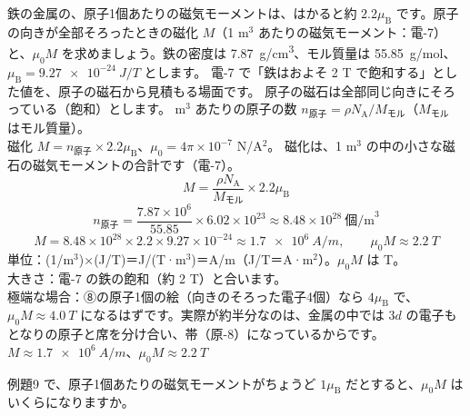 \label{ph:原-7:ex9}
\begin{phreidai}[鉄の原子の磁石を全部そろえると]
鉄の金属の、原子1個あたりの磁気モーメントは、はかると約 $2.2\mu_{\mathrm B}$ です。原子の向きが全部そろったときの磁化 $M$（1 m$^3$ あたりの磁気モーメント：電-7）と、$\mu_0M$ を求めましょう。鉄の密度は \qty{7.87}{g/cm^3}、モル質量は \qty{55.85}{g/mol}、$\mu_{\mathrm B}=\qty{9.27e-24}{J/T}$ とします。
\phbamen
電-7 で「鉄はおよそ 2 T で飽和する」とした値を、原子の磁石から見積もる場面です。
\phmushi
原子の磁石は全部同じ向きにそろっている（飽和）とします。
 m$^3$ あたりの原子の数 $n_{\text{原子}}=\rho N_{\mathrm A}/M_{\text{モル}}$（$M_{\text{モル}}$ はモル質量）。\\
磁化 $M=n_{\text{原子}}\times2.2\mu_{\mathrm B}$、$\mu_0=4\pi\times10^{-7}$ N/A$^2$。
\phriyu
磁化は、1 m$^3$ の中の小さな磁石の磁気モーメントの合計です（電-7）。
\phtateru
\[ M=\frac{\rho N_{\mathrm A}}{M_{\text{モル}}}\times2.2\mu_{\mathrm B} \]
\phtoku
\[ n_{\text{原子}}=\frac{7.87\times10^6}{55.85}\times6.02\times10^{23}\approx8.48\times10^{28}\ \text{個/m}^3 \]
\[ M=8.48\times10^{28}\times2.2\times9.27\times10^{-24}\approx\qty{1.7e6}{A/m},\qquad \mu_0M\approx\qty{2.2}{T} \]
\phtashikame
単位：(1/m$^3$)×(J/T)＝J/(T·m$^3$)＝A/m（J/T＝A·m$^2$）。$\mu_0M$ は T。\\
大きさ：電-7 の鉄の飽和（約 2 T）と合います。\\
極端な場合：⑧の原子1個の絵（向きのそろった電子4個）なら $4\mu_{\mathrm B}$ で、$\mu_0M\approx\qty{4.0}{T}$ になるはずです。実際が約半分なのは、金属の中では $3d$ の電子もとなりの原子と席を分け合い、帯（原-8）になっているからです。
\kotae $M\approx\qty{1.7e6}{A/m}$、$\mu_0M\approx\qty{2.2}{T}$
\end{phreidai}
\begin{jibun}
例題9 で、原子1個あたりの磁気モーメントがちょうど $1\mu_{\mathrm B}$ だとすると、$\mu_0M$ はいくらになりますか。
\end{jibun}


